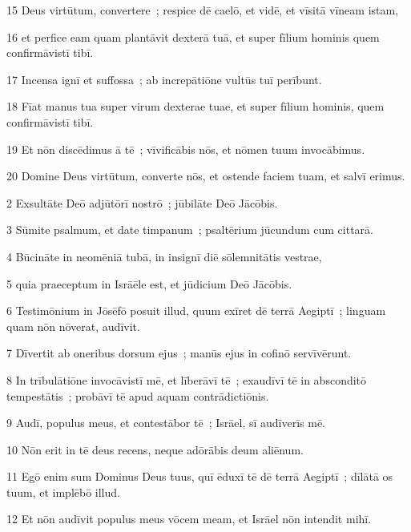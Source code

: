 \psalmVerse
  {\phantom{0}15}
  {Deus virtūtum, convertere~; respice dē caelō, et vidē, et vīsitā vīneam istam,}


\psalmVerse
  {\phantom{0}16}
  {et perfice eam quam plantāvit dexterā tuā, et super fīlium hominis quem confirmāvistī tibī.}


\psalmVerse
  {\phantom{0}17}
  {Incensa ignī et suffossa~; ab increpātiōne vultūs tuī perībunt.}


\psalmVerse
  {\phantom{0}18}
  {Fīat manus tua super virum dexterae tuae, et super fīlium hominis, quem confirmāvistī tibī.}


\psalmVerse
  {\phantom{0}19}
  {Et nōn discēdimus ā tē~; vīvificābis nōs, et nōmen tuum invocābimus.}


\psalmVerse
  {\phantom{0}20}
  {Domine Deus virtūtum, converte nōs, et ostende faciem tuam, et salvī erimus.}



\psalmVerse
  {\phantom{00}2}
  {Exsultāte Deō adjūtōrī nostrō~; jūbilāte Deō Jācōbis.}


\psalmVerse
  {\phantom{00}3}
  {Sūmite psalmum, et date timpanum~; psaltērium jūcundum cum cittarā.}


\psalmVerse
  {\phantom{00}4}
  {Būcināte in neomēniā tubā, in insignī diē sōlemnitātis vestrae,}


\psalmVerse
  {\phantom{00}5}
  {quia praeceptum in Isrāēle est, et jūdicium Deō Jācōbis.}


\psalmVerse
  {\phantom{00}6}
  {Testimōnium in Jōsēfō posuit illud, quum exīret dē terrā Aegiptī~; linguam quam nōn nōverat, audīvit.}


\psalmVerse
  {\phantom{00}7}
  {Dīvertit ab oneribus dorsum ejus~; manūs ejus in cofinō servīvērunt.}


\psalmVerse
  {\phantom{00}8}
  {In trībulātiōne invocāvistī mē, et līberāvī tē~; exaudīvī tē in absconditō tempestātis~; probāvī tē apud aquam contrādictiōnis.}


\psalmVerse
  {\phantom{00}9}
  {Audī, populus meus, et contestābor tē~; Isrāel, sī audīverīs mē.}


\psalmVerse
  {\phantom{0}10}
  {Nōn erit in tē deus recens, neque adōrābis deum aliēnum.}


\psalmVerse
  {\phantom{0}11}
  {Egō enim sum Dominus Deus tuus, quī ēduxī tē dē terrā Aegiptī~; dīlātā os tuum, et implēbō illud.}


\psalmVerse
  {\phantom{0}12}
  {Et nōn audīvit populus meus vōcem meam, et Isrāel nōn intendit mihī.}



